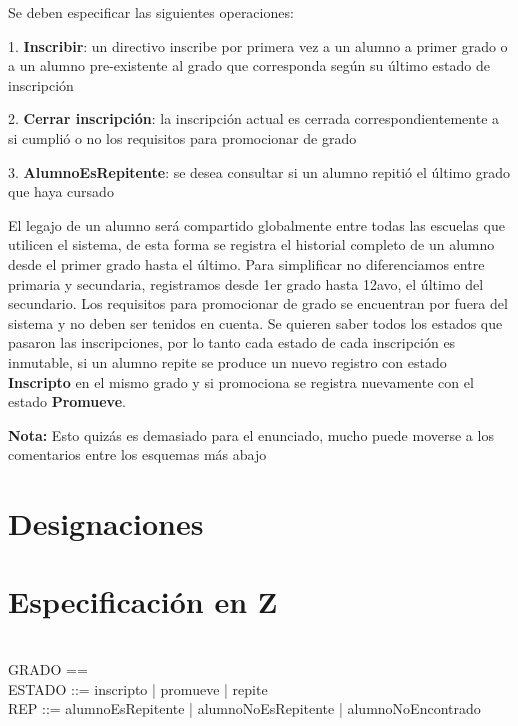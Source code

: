 \documentclass{article}
\begin{document}
Se deben especificar las siguientes operaciones:

1. \textbf{Inscribir}: un directivo inscribe por primera vez a un alumno a primer grado o a un alumno pre-existente al grado que corresponda según su último estado de inscripción

2. \textbf{Cerrar inscripción}: la inscripción actual es cerrada correspondientemente a si cumplió o no los requisitos para promocionar de grado

3. \textbf{AlumnoEsRepitente}: se desea consultar si un alumno repitió el último grado que haya cursado

El legajo de un alumno será compartido globalmente entre todas las escuelas que utilicen el sistema, de esta forma se registra el historial completo de un alumno desde el primer grado hasta el último.
Para simplificar no diferenciamos entre primaria y secundaria, registramos desde 1er grado hasta 12avo, el último del secundario. Los requisitos para promocionar de grado se encuentran por fuera del sistema y no deben ser tenidos en cuenta.
Se quieren saber todos los estados que pasaron las inscripciones, por lo tanto cada estado de cada inscripción es inmutable, si un alumno repite se produce un nuevo registro con estado \textbf{Inscripto} en el mismo grado y si promociona se registra nuevamente con el estado \textbf{Promueve}.

\textbf{Nota:} Esto quizás es demasiado para el enunciado, mucho puede moverse a los comentarios entre los esquemas más abajo


\section*{Designaciones}

\section*{Especificación en Z}
  \begin{zed}
    [ALUMNO] \\
    GRADO == \nat \\
    ESTADO ::= inscripto | promueve | repite \\
    REP ::= alumnoEsRepitente | alumnoNoEsRepitente | alumnoNoEncontrado
  \end{zed}
  
\end{document}
